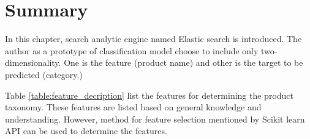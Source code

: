 \section{Summary}

In this chapter, search analytic engine named Elastic search is introduced. The author as a prototype of classification model choose to include only two-dimensionality. One is the feature (product name) and other is the target to be predicted (category.)

Table \ref{table:feature_decription} list the features for determining the product taxonomy. These features are listed based on general knowledge and understanding. However, method for feature selection mentioned by Scikit learn API \parencite{sklearn_api} can be used to determine the features.